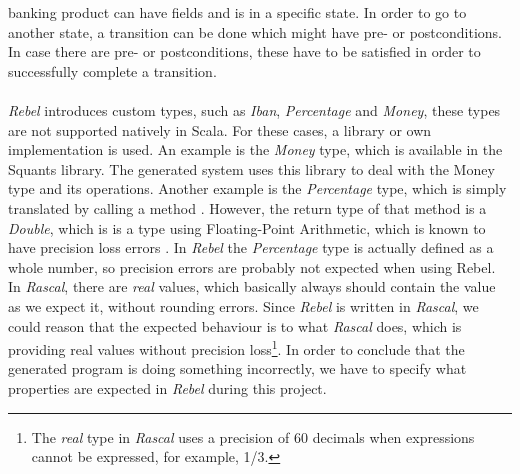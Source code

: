 banking product can have fields and is in a specific state. In order to go to
another state, a transition can be done which might have pre- or postconditions.
In case there are pre- or postconditions, these have to be satisfied in order to
successfully complete a transition.\\
\\
\textit{Rebel} introduces custom types, such as \textit{Iban}, \textit{Percentage} and \textit{Money}, these types are not supported natively in Scala. For these cases, a library or own implementation is used. An example is the \textit{Money} type, which is available in the Squants \cite{siteSquants2017} library. The generated system uses this library to deal with the Money type and its operations. Another example is the \textit{Percentage} type, which is simply translated by calling a method . However, the return type of that method is a \textit{Double}, which is is a type using Floating-Point Arithmetic, which is known to have precision loss errors \cite{goldberg1991every}. In \textit{Rebel} the \textit{Percentage} type is actually defined as a whole number, so precision errors are probably not expected when using Rebel. In \textit{Rascal}, there are \textit{real} values, which basically always should contain the value as we expect it, without rounding errors. Since \textit{Rebel} is written in \textit{Rascal}, we could reason that the expected behaviour is to what \textit{Rascal} does, which is providing real values without precision loss\footnote{The \textit{real} type in \textit{Rascal} uses a precision of 60 decimals when expressions cannot be expressed, for example, 1/3.}. In order to conclude that the generated program is doing something incorrectly, we have to specify what properties are expected in \textit{Rebel} during this project.


